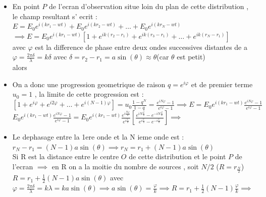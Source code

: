 \documentclass[12pt]{book}
\begin{document}
            \begin{itemize}
                \item En point $P$ de l'ecran d'observation situe loin du plan de cette distribution , le champ resultant s' ecrit :\\
                        $E=E_0e^{i(kr_1-wt)}+E_0e^{i(kr_2-wt)}+\ldots+E_0e^{i(kr_N-wt)} $\\
                        $\implies E=E_0e^{i(kr_1-wt)}\left[1+e^{ik(r_2-r_1)}+e^{ik(r_3-r_1)}+\ldots+e^{ik(r_N-r_1)}\right] $\\ 
                        avec $\varphi$ est la difference de phase entre deux ondes successives distantes de a \\
                        $\varphi=\frac{2\pi\delta}{\lambda}=k\delta $ avec $\delta = r_2 - r_1 = a\sin(\theta) \approx \theta$(car $\theta$ est petit)\\
                        alors 
                \item On a donc une progression geometrique de raison $q=e^{i\varphi}$ et de premier terme $u_0 =1$ , la limite de cette progression est : \\
                    $[1+e^{i\varphi}+e^{i2\varphi}+\ldots+e^{i(N-1)\varphi}]=u_0\frac{1-q^N}{1-q} = \frac{e^{iN\varphi}-1}{e^{i\varphi} - 1} \implies E=E_0e^{i(kr_1-wt)}\frac{e^{iN\varphi}-1}{e^{i\varphi} - 1} $
                    $E_0e^{i(kr_1-wt)}\frac{e^{iN\varphi}-1}{e^{i\varphi} - 1} = E_0e^{i(kr_1-wt)}\frac{e^{i\frac{N\varphi}{2}}}{e^{i\frac{\varphi}{2}}}\left[ \frac{e^{iN\frac{\varphi}{2}} - e^{-iN\frac{\varphi}{2}}}{e^{i\frac{\varphi}{2}}- e^{-i\frac{\varphi}{2}}} \right] \implies $ \\
                \pagebreak 
                \item Le dephasage entre la 1ere onde et la N ieme onde est : \\
                    $r_N-r_1=(N-1)a\sin(\theta)\implies r_N=r_1+(N-1)a\sin(\theta)$ \\
                    Si R est la distance entre le centre $O$ de cette distribution et le point $P$ de l'ecran $\implies$ en R on a la moitie du nombre de sources , soit $N/2$ ($R=r_{\frac{N}{2}}$)\\
                    $R = r_1 + \frac{1}{2}(N-1)a\sin(\theta)$ avec $\varphi = \frac{2\pi\delta}{\lambda}=k\lambda=ka\sin(\theta)\implies a\sin(\theta) = \frac{\varphi}{k} \implies R = r_1 + \frac{1}{2}(N-1)\frac{\varphi}{k} \implies $ \\

\end{itemize}
\end{document}
